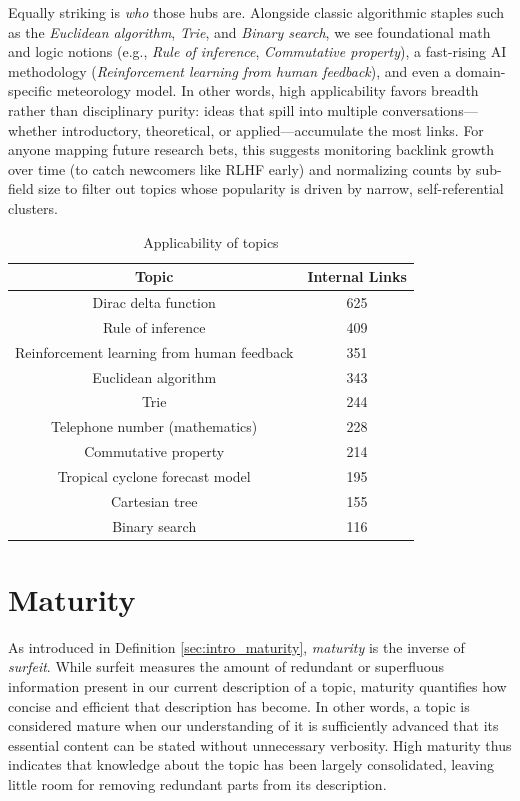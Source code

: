 Equally striking is \emph{who} those hubs are. Alongside classic algorithmic staples such as the \emph{Euclidean algorithm}, \emph{Trie}, and \emph{Binary search}, we see foundational math and logic notions (e.g., \emph{Rule of inference}, \emph{Commutative property}), a fast-rising AI methodology (\emph{Reinforcement learning from human feedback}), and even a domain-specific meteorology model. In other words, high applicability favors breadth rather than disciplinary purity: ideas that spill into multiple conversations—whether introductory, theoretical, or applied—accumulate the most links. For anyone mapping future research bets, this suggests monitoring backlink growth over time (to catch newcomers like RLHF early) and normalizing counts by sub-field size to filter out topics whose popularity is driven by narrow, self-referential clusters.

\begin{table}
\begin{centering}
\begin{tabular}{|c|c|}
\hline 
Topic & Internal Links \tabularnewline
\hline
\hline
Dirac delta function & 625\tabularnewline
\hline
Rule of inference & 409\tabularnewline
\hline
Reinforcement learning from human feedback & 351\tabularnewline
\hline
Euclidean algorithm & 343\tabularnewline
\hline
Trie & 244\tabularnewline
\hline
Telephone number (mathematics) & 228\tabularnewline
\hline
Commutative property & 214\tabularnewline
\hline
Tropical cyclone forecast model & 195\tabularnewline
\hline
Cartesian tree & 155\tabularnewline
\hline
Binary search & 116\tabularnewline
\hline 
\end{tabular}
\par\end{centering}
\caption{\label{tab:Applicability-of-Topics}Applicability of topics}
\end{table}

%
%

\section{Maturity}

As introduced in Definition \ref{sec:intro_maturity}, \emph{maturity} is the inverse of \emph{surfeit}. While surfeit measures the amount of redundant or superfluous information present in our current description of a topic, maturity quantifies how concise and efficient that description has become. In other words, a topic is considered mature when our understanding of it is sufficiently advanced that its essential content can be stated without unnecessary verbosity. High maturity thus indicates that knowledge about the topic has been largely consolidated, leaving little room for removing redundant parts from its description.

